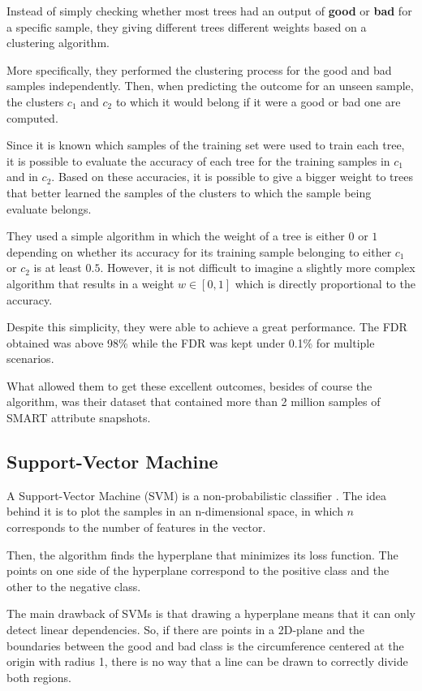 Instead of simply checking whether most trees had an output of \textbf{good} or \textbf{bad} for a specific sample, they giving different trees different weights based on a clustering algorithm.

More specifically, they performed the clustering process for the good and bad samples independently.
Then, when predicting the outcome for an unseen sample, the clusters $c_1$ and $c_2$ to which it would belong if it were a good or bad one are computed.

Since it is known which samples of the training set were used to train each tree, it is possible to evaluate the accuracy of each tree for the training samples in $c_1$ and in $c_2$.
Based on these accuracies, it is possible to give a bigger weight to trees that better learned the samples of the clusters to which the sample being evaluate belongs.

They used a simple algorithm in which the weight of a tree is either $0$ or $1$ depending on whether its accuracy for its training sample belonging to either $c_1$ or $c_2$ is at least $0.5$.
However, it is not difficult to imagine a slightly more complex algorithm that results in a weight $w \in \left[0,1\right]$ which is directly proportional to the accuracy.

Despite this simplicity, they were able to achieve a great performance.
The FDR obtained was above 98\% while the FDR was kept under 0.1\% for multiple scenarios.

What allowed them to get these excellent outcomes, besides of course the algorithm, was their dataset that contained more than 2 million samples of SMART attribute snapshots.

\subsection{Support-Vector Machine}

A Support-Vector Machine (SVM) is a non-probabilistic classifier \cite{cortes1995support}.
The idea behind it is to plot the samples in an n-dimensional space, in which $n$ corresponds to the number of features in the vector.

Then, the algorithm finds the hyperplane that minimizes its loss function.
The points on one side of the hyperplane correspond to the positive class and the other to the negative class.

The main drawback of SVMs is that drawing a hyperplane means that it can only detect linear dependencies.
So, if there are points in a 2D-plane and the boundaries between the good and bad class is the circumference centered at the origin with radius 1, there is no way that a line can be drawn to correctly divide both regions.

